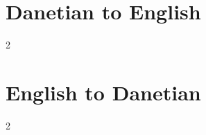 \documentclass[10pt]{article}
\begin{document}
\section*{Danetian to English}
\begin{multicols}{2}

\end{multicols}
\clearpage
\section*{English to Danetian}
\begin{multicols}{2}

\end{multicols}
\end{document}
